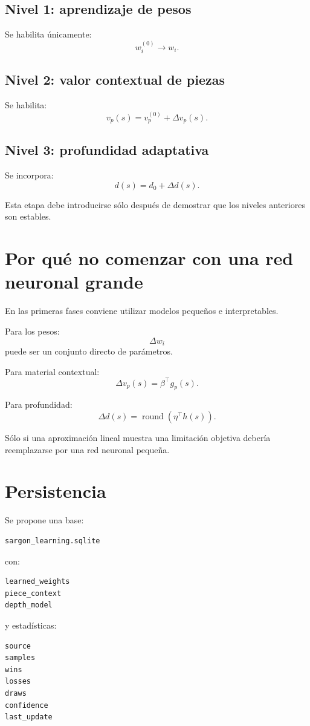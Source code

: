\documentclass[11pt,a4paper]{article}
\begin{document}
\subsection*{Nivel 1: aprendizaje de pesos}
Se habilita únicamente:
\[
w_i^{(0)}\rightarrow w_i.
\]

\subsection*{Nivel 2: valor contextual de piezas}
Se habilita:
\[
v_p(s)
=
v_p^{(0)}
+
\Delta v_p(s).
\]

\subsection*{Nivel 3: profundidad adaptativa}
Se incorpora:
\[
d(s)=d_0+\Delta d(s).
\]

Esta etapa debe introducirse sólo después de demostrar que los niveles anteriores son estables.

\section{Por qué no comenzar con una red neuronal grande}
En las primeras fases conviene utilizar modelos pequeños e interpretables.

Para los pesos:
\[
\Delta w_i
\]
puede ser un conjunto directo de parámetros.

Para material contextual:
\[
\Delta v_p(s)
=
\beta^\top g_p(s).
\]

Para profundidad:
\[
\Delta d(s)
=
\operatorname{round}
\left(
\eta^\top h(s)
\right).
\]

Sólo si una aproximación lineal muestra una limitación objetiva debería reemplazarse por una red neuronal pequeña.

\section{Persistencia}
Se propone una base:
\begin{lstlisting}
sargon_learning.sqlite
\end{lstlisting}

con:
\begin{lstlisting}
learned_weights
piece_context
depth_model
\end{lstlisting}

y estadísticas:
\begin{lstlisting}
source
samples
wins
losses
draws
confidence
last_update
\end{lstlisting}
\end{document}

